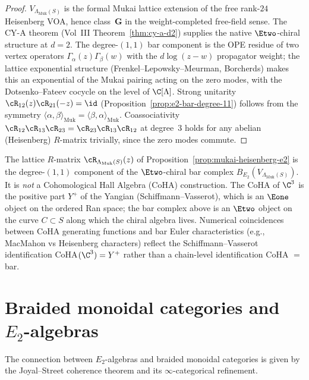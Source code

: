 \begin{proof}
$V_{\Lambda_{\mathrm{Muk}}(S)}$ is the formal Mukai lattice extension of
the free rank-$24$ Heisenberg VOA, hence class~$\mathbf{G}$ in the
weight-completed free-field sense. The CY-A theorem
(Vol~III Theorem~\ref{thm:cy-a-d2}) supplies the native
$\Etwo$-chiral structure at $d = 2$. The degree-$(1,1)$ bar
component is the OPE residue of two vertex operators
$\Gamma_\alpha(z) \Gamma_\beta(w)$ with the
$d \log(z - w)$ propagator weight; the lattice
exponential structure (Frenkel--Lepowsky--Meurman, Borcherds)
makes this an exponential of the Mukai pairing acting on the
zero modes, with the Dotsenko--Fateev cocycle on the level of
$\C[\Lambda]$. Strong unitarity
$\cR_{12}(z) \cR_{21}(-z) = \id$
(Proposition~\ref{prop:e2-bar-degree-11}) follows from the
symmetry $\langle \alpha, \beta \rangle_{\mathrm{Muk}} = \langle
\beta, \alpha \rangle_{\mathrm{Muk}}$. Coassociativity
$\cR_{12}\cR_{13}\cR_{23} = \cR_{23}\cR_{13}\cR_{12}$ at
degree~$3$ holds for any abelian (Heisenberg) $R$-matrix
trivially, since the zero modes commute.
\end{proof}

\begin{remark}
\label{rem:bf-coha-not-bar}
The lattice $R$-matrix $\cR_{\Lambda_{\mathrm{Muk}}(S)}(z)$ of
Proposition~\ref{prop:mukai-heisenberg-e2} is the degree-$(1,1)$
component of the $\Etwo$-chiral bar complex $B_{E_2}(V_{\Lambda_{\mathrm{Muk}}(S)})$.
It is \emph{not} a Cohomological Hall Algebra (CoHA) construction.
The CoHA of $\C^3$ is the positive part $Y^+$ of the
Yangian (Schiffmann--Vasserot), which is an $\Eone$ object on the
ordered Ran space; the bar complex above is an $\Etwo$ object on
the curve $C \subset S$ along which the chiral algebra lives. Numerical
coincidences between CoHA generating functions and bar Euler
characteristics (e.g., MacMahon vs Heisenberg characters) reflect
the Schiffmann--Vasserot identification CoHA$(\C^3) = Y^+$ rather
than a chain-level identification CoHA $=$ bar.
\end{remark}


\section{Braided monoidal categories and \texorpdfstring{$E_2$}{E-2}-algebras}
\label{sec:braided-e2}

The connection between $E_2$-algebras and braided monoidal categories is
given by the Joyal--Street coherence theorem and its
$\infty$-categorical refinement.


